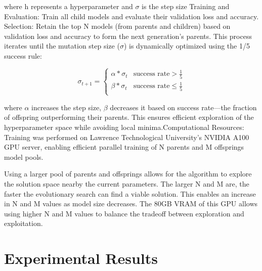 \documentclass[conference]{IEEEtran}
\begin{document}
where h represents a hyperparameter and $\sigma$ is the step size
Training and Evaluation: Train all child models and evaluate their validation loss and accuracy.
Selection: Retain the top N models (from parents and children) based on validation loss and accuracy to form the next generation's parents.
This process iterates until the mutation step size ($\sigma$) is dynamically optimized using the 1/5 success rule:

\begin{equation}
    \sigma_{t+1} = \left\{
    \begin{array}{ll}
    \alpha * \sigma_t & \text{success rate} > \frac{1}{5} \\
    \beta * \sigma_t & \text{success rate} \leq \frac{1}{5} \\
    \end{array}
    \right.
\end{equation}


where $\alpha$ increases the step size, $\beta$ decreases it based on success rate—the fraction of offspring outperforming their parents. This ensures efficient exploration of the hyperparameter space while avoiding local minima.Computational Resources: Training was performed on Lawrence Technological University’s NVIDIA A100 GPU server, enabling efficient parallel training of N parents and M offsprings model pools.

Using a larger pool of parents and offsprings allows for the algorithm to explore the solution space nearby the current parameters. The larger N and M are, the faster the evolutionary search can find a viable solution. This enables an increase in N and M values as model size decreases. The 80GB VRAM of this GPU allows using higher N and M values to balance the tradeoff between exploration and exploitation.


\section{Experimental Results}
\end{document}
